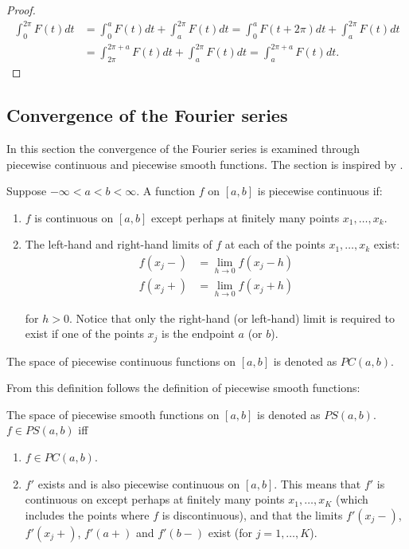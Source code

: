 \begin{proof}
\begin{align*}
	\int_0^{2\pi} F(t)dt 
	&= \int_0^a F(t) dt + \int_a^{2\pi} F(t) dt
	= \int_0^a F(t+2\pi)dt + \int_a^{2\pi} F(t) dt\\ 
	&= \int_{2\pi}^{2\pi + a} F(t) dt + \int_a^{2\pi}F(t)dt
	= \int_a^{2\pi+a}F(t)dt.
\end{align*}
\end{proof}

\subsection{Convergence of the Fourier series}
In this section the convergence of the Fourier series is examined through piecewise continuous and piecewise smooth functions. The section is inspired by \cite{page 31-36, FAA}.

\begin{definition}
Suppose $-\infty < a < b < \infty$. A function $f$ on $[a,b]$ is piecewise continuous if:
\begin{enumerate}
\item $f$ is continuous on $[a,b]$ except perhaps at finitely many points $x_1, \dots, x_k$.
\item The left-hand and right-hand limits of $f$ at each of the points $x_1, \dots, x_k$ exist:
\begin{align*}
f(x_j-) &= \lim_{h\to 0} f(x_j - h) \\
f(x_j+) &= \lim_{h\to 0} f(x_j + h)
\end{align*}

for $h > 0$. Notice that only the right-hand (or left-hand) limit is required to exist if one of the points $x_j$ is the endpoint $a$ (or $b$).
\end{enumerate}

The space of piecewise continuous functions on $[a,b]$ is denoted as $PC(a,b)$.
\end{definition}

From this definition follows the definition of piecewise smooth functions:
\begin{definition}
The space of piecewise smooth functions on $[a,b]$ is denoted as $PS(a,b)$. $f\in PS(a,b)$ iff
\begin{enumerate}
	\item $f \in PC(a,b)$.
	\item $f'$ exists and is also piecewise continuous on $[a,b]$. This means that $f'$ is continuous on except perhaps at finitely many points $x_1, \dots, x_K$ (which includes the points where $f$ is discontinuous), and that the limits $f'(x_j-)$, $f'(x_j+)$, $f'(a+)$ and $f'(b-)$ exist (for $j = 1,\dots, K$).
\end{enumerate}
\end{definition}

